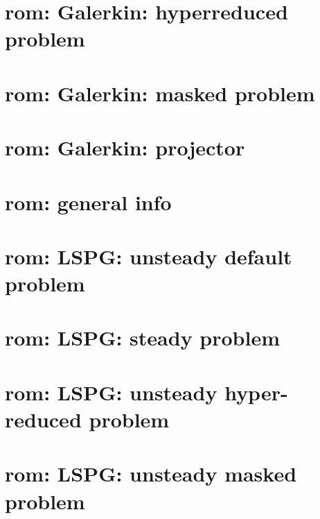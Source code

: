 \let\mypdfximage\pdfximage\def\pdfximage{\immediate\mypdfximage}\documentclass[twoside]{book}
\newcommand{\+}{\discretionary{\mbox{\scriptsize$\hookleftarrow$}}{}{}}
\begin{document}
\chapter{rom\+: Galerkin\+: hyperreduced problem}
\label{md_pages_components_rom_galerkin_hypred}

\chapter{rom\+: Galerkin\+: masked problem}
\label{md_pages_components_rom_galerkin_masked}

\chapter{rom\+: Galerkin\+: projector}
\label{md_pages_components_rom_galerkin_projector}

\chapter{rom\+: general info}
\label{md_pages_components_rom_general}

\chapter{rom\+: LSPG\+: unsteady default problem}
\label{md_pages_components_rom_lspg_default}

\chapter{rom\+: LSPG\+: steady problem}
\label{md_pages_components_rom_lspg_default_steady}

\chapter{rom\+: LSPG\+: unsteady hyper-\/reduced problem}
\label{md_pages_components_rom_lspg_hypred}

\chapter{rom\+: LSPG\+: unsteady masked problem}
\label{md_pages_components_rom_lspg_masked}

\end{document}
